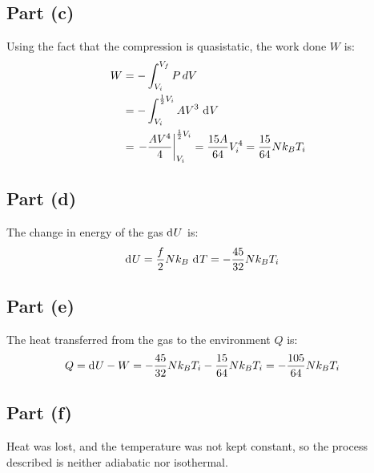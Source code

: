 \documentclass{article}
\begin{document}
\subsection*{Part (c)}
Using the fact that the compression is quasistatic, the work done $W$ is:
\begin{equation}
    \begin{split}
        W & = -\int_{V_i}^{V_f} P \, dV \\
        & = -\int_{V_i}^{\frac{1}{2}V_i} AV^3 \, \diff{V} \\
        & = \left.-\frac{AV^4}{4}\right\vert_{V_i}^{\frac{1}{2}V_i} = \frac{15A}{64}V_i^4 = \frac{15}{64}Nk_B T_i
    \end{split}
\end{equation}
\subsection*{Part (d)}
The change in energy of the gas $\diff{U}$ is:
\begin{equation}
    \begin{split}
        \diff{U} & = \frac{f}{2}Nk_B \, \diff{T} = -\frac{45}{32}Nk_B T_i
    \end{split}
\end{equation}
\subsection*{Part (e)}
The heat transferred from the gas to the environment $Q$ is:
\begin{equation}
    \begin{split}
        Q = \diff{U} - W & = -\frac{45}{32}Nk_B T_i - \frac{15}{64}Nk_B T_i = -\frac{105}{64}Nk_B T_i
    \end{split}
\end{equation}
\subsection*{Part (f)}
Heat was lost, and the temperature was not kept constant, so the process described is neither adiabatic nor isothermal.
\end{document}
